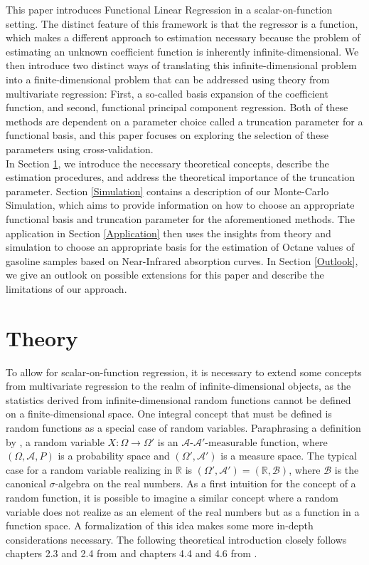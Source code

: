 \documentclass[11pt,twoside,a4paper]{article}
\begin{document}
	This paper introduces Functional Linear Regression in a scalar-on-function setting. The distinct feature of this framework is that the regressor is a function, which makes a different approach to estimation necessary because the problem of estimating an unknown coefficient function is inherently infinite-dimensional. 
	We then introduce two distinct ways of translating this infinite-dimensional problem into a finite-dimensional problem that can be addressed using theory from multivariate regression: First, a so-called basis expansion of the coefficient function, and second, functional principal component regression. Both of these methods are dependent on a parameter choice called a truncation parameter for a functional basis, and this paper focuses on exploring the selection of these parameters using cross-validation.\\
	
	In Section \ref{Theory}, we introduce the necessary theoretical concepts, describe the estimation procedures, and address the theoretical importance of the truncation parameter. Section \ref{Simulation} contains a description of our Monte-Carlo Simulation, which aims to provide information on how to choose an appropriate functional basis and truncation parameter for the aforementioned methods. The application in Section \ref{Application} then uses the insights from theory and simulation to choose an appropriate basis for the estimation of Octane values of gasoline samples based on Near-Infrared absorption curves. In Section \ref{Outlook}, we give an outlook on possible extensions for this paper and describe the limitations of our approach.

	\section{Theory}\label{Theory}
	To allow for scalar-on-function regression, it is necessary to extend some concepts from multivariate regression to the realm of infinite-dimensional objects, as the statistics derived from infinite-dimensional random functions cannot be defined on a finite-dimensional space. One integral concept that must be defined is random functions as a special case of random variables. Paraphrasing a definition by \cite{bauer_wahrscheinlichkeitstheorie_2020}, a random variable $X:\Omega \rightarrow \Omega'$ is an $\mathcal{A} \text{-} \mathcal{A'} \text{-measurable}$ function, where $(\Omega, \mathcal{A}, P)$ is a probability space and $(\Omega', \mathcal{A'})$ is a measure space. 
	The typical case for a random variable realizing in $\mathbb{R}$ is $(\Omega', \mathcal{A'}) = (\mathbb{R}, \mathcal{B})$, where $\mathcal{B}$ is the canonical $\sigma$-algebra on the real numbers. As a first intuition for the concept of a random function, it is possible to imagine a similar concept where a random variable does not realize as an element of the real numbers but as a function in a function space. A formalization of this idea makes some more in-depth considerations necessary. The following theoretical introduction closely follows chapters 2.3 and 2.4 from \cite{hsing_theoretical_2015} and chapters 4.4 and 4.6 from \cite{kokoszka_introduction_2017}. 
	
\end{document}
